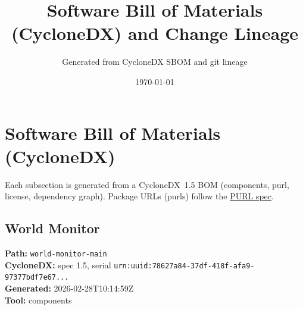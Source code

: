 \documentclass[11pt,a4paper]{article}
\title{\textbf{Software Bill of Materials (CycloneDX) and Change Lineage}}
\author{Generated from CycloneDX SBOM and git lineage}
\date{\today}
\begin{document}
\maketitle
\tableofcontents
\newpage
\section{Software Bill of Materials (CycloneDX)}
Each subsection is generated from a CycloneDX~1.5 BOM (components, purl, license, dependency graph). Package URLs (purls) follow the \href{https://github.com/package-url/purl-spec}{PURL spec}.

\subsection{World Monitor}
\textbf{Path:} \texttt{world-monitor-main}
\\ \textbf{CycloneDX:} spec 1.5, serial \texttt{urn:uuid:78627a84-37df-418f-afa9-97377bdf7e67...}
\\ \textbf{Generated:} 2026-02-28T10:14:59Z
\\ \textbf{Tool:} components
\end{document}
